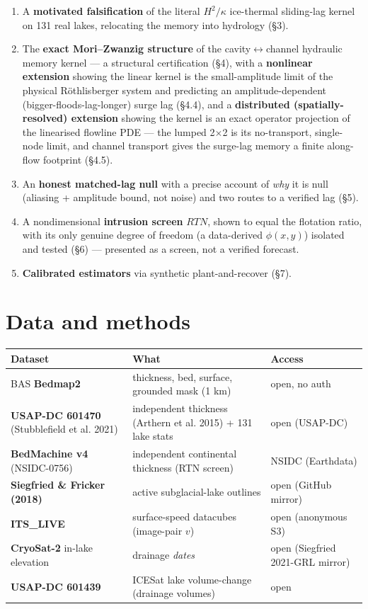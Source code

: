 \documentclass[tc, manuscript]{copernicus}
\begin{document}
\begin{enumerate}
\item A \textbf{motivated falsification} of the literal $H^{2}/\kappa $ ice-thermal sliding-lag kernel on 131 real lakes, relocating the memory into hydrology (§3).
\item The \textbf{exact Mori–Zwanzig structure} of the cavity\ensuremath{\leftrightarrow}channel hydraulic memory kernel — a structural certification (§4), with a \textbf{nonlinear extension} showing the linear kernel is the small-amplitude limit of the physical Röthlisberger system and predicting an amplitude-dependent (bigger-floods-lag-longer) surge lag (§4.4), and a \textbf{distributed (spatially-resolved) extension} showing the kernel is an exact operator projection of the linearised flowline PDE — the lumped 2\ensuremath{\times}2 is its no-transport, single-node limit, and channel transport gives the surge-lag memory a finite along-flow footprint (§4.5).
\item An \textbf{honest matched-lag null} with a precise account of \emph{why} it is null (aliasing + amplitude bound, not noise) and two routes to a verified lag (§5).
\item A nondimensional \textbf{intrusion screen} $RTN$, shown to equal the flotation ratio, with its only genuine degree of freedom (a data-derived $\phi (x,y)$) isolated and tested (§6) — presented as a screen, not a verified forecast.
\item \textbf{Calibrated estimators} via synthetic plant-and-recover (§7).
\end{enumerate}

\section{Data and methods}

\begin{center}\small
\begin{tabularx}{\linewidth}{>{\raggedright\arraybackslash}X>{\raggedright\arraybackslash}X>{\raggedright\arraybackslash}X}
\hline
Dataset & What & Access \\
\hline
BAS \textbf{Bedmap2} & thickness, bed, surface, grounded mask (1 km) & open, no auth \\
\textbf{USAP-DC 601470} (Stubblefield et al. 2021) & independent thickness (Arthern et al. 2015) + 131 lake stats & open (USAP-DC) \\
\textbf{BedMachine v4} (NSIDC-0756) & independent continental thickness (RTN screen) & NSIDC (Earthdata) \\
\textbf{Siegfried \& Fricker (2018)} & 131 active subglacial-lake outlines & open (GitHub mirror) \\
\textbf{ITS\_LIVE} & surface-speed datacubes (image-pair $v$) & open (anonymous S3) \\
\textbf{CryoSat-2} in-lake elevation & drainage \emph{dates} & open (Siegfried 2021-GRL mirror) \\
\textbf{USAP-DC 601439} & ICESat lake volume-change (drainage volumes) & open \\
\hline
\end{tabularx}
\end{center}
\end{document}
